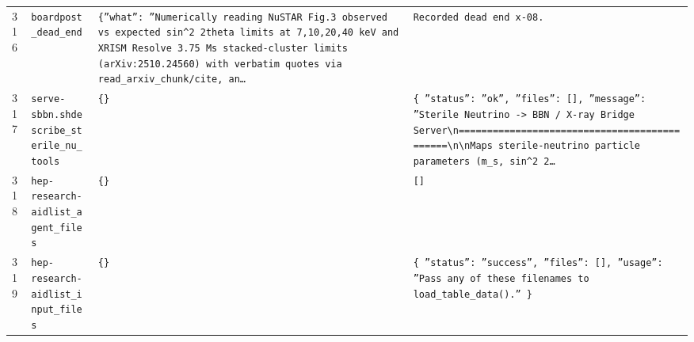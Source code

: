 \documentclass[11pt,a4paper]{article}
\begin{document}
\begin{longtable}{@{}p{}p{}p{}p{}@{}}
316 & \texttt{board}\newline\texttt{post\_\allowbreak{}dead\_\allowbreak{}end} & \texttt{\{''what'':\allowbreak{} ''Numerically reading NuSTAR Fig.3 observed vs expected sin\textasciicircum{}\allowbreak{}2 2theta limits at 7,\allowbreak{}10,\allowbreak{}20,\allowbreak{}40 keV and XRISM Resolve 3.75 Ms stacked-cluster limits (arXiv:\allowbreak{}2510.24560)\allowbreak{} with verbatim quotes via read\_\allowbreak{}arxiv\_\allowbreak{}chunk/\allowbreak{}cite,\allowbreak{} an\ldots{}\allowbreak{}} & \texttt{Recorded dead end x-08.} \\
317 & \texttt{serve-sbbn.sh}\newline\texttt{describe\_\allowbreak{}sterile\_\allowbreak{}nu\_\allowbreak{}tools} & \texttt{\{\}\allowbreak{}} & \texttt{\{   ''status'':\allowbreak{} ''ok'',\allowbreak{}   ''files'':\allowbreak{} []\allowbreak{},\allowbreak{}   ''message'':\allowbreak{} ''Sterile Neutrino -\textgreater{}\allowbreak{} BBN /\allowbreak{} X-ray Bridge Server\textbackslash{}\allowbreak{}n=\allowbreak{}=\allowbreak{}=\allowbreak{}=\allowbreak{}=\allowbreak{}=\allowbreak{}=\allowbreak{}=\allowbreak{}=\allowbreak{}=\allowbreak{}=\allowbreak{}=\allowbreak{}=\allowbreak{}=\allowbreak{}=\allowbreak{}=\allowbreak{}=\allowbreak{}=\allowbreak{}=\allowbreak{}=\allowbreak{}=\allowbreak{}=\allowbreak{}=\allowbreak{}=\allowbreak{}=\allowbreak{}=\allowbreak{}=\allowbreak{}=\allowbreak{}=\allowbreak{}=\allowbreak{}=\allowbreak{}=\allowbreak{}=\allowbreak{}=\allowbreak{}=\allowbreak{}=\allowbreak{}=\allowbreak{}=\allowbreak{}=\allowbreak{}=\allowbreak{}=\allowbreak{}=\allowbreak{}=\allowbreak{}=\allowbreak{}=\allowbreak{}\textbackslash{}\allowbreak{}n\textbackslash{}\allowbreak{}nMaps sterile-neutrino particle parameters (m\_\allowbreak{}s,\allowbreak{} sin\textasciicircum{}\allowbreak{}2 2\ldots{}\allowbreak{}} \\
318 & \texttt{hep-research-aid}\newline\texttt{list\_\allowbreak{}agent\_\allowbreak{}files} & \texttt{\{\}\allowbreak{}} & \texttt{[]\allowbreak{}} \\
319 & \texttt{hep-research-aid}\newline\texttt{list\_\allowbreak{}input\_\allowbreak{}files} & \texttt{\{\}\allowbreak{}} & \texttt{\{   ''status'':\allowbreak{} ''success'',\allowbreak{}   ''files'':\allowbreak{} []\allowbreak{},\allowbreak{}   ''usage'':\allowbreak{} ''Pass any of these filenames to load\_\allowbreak{}table\_\allowbreak{}data()\allowbreak{}.'' \}\allowbreak{}} \\

\end{longtable}
\end{document}
